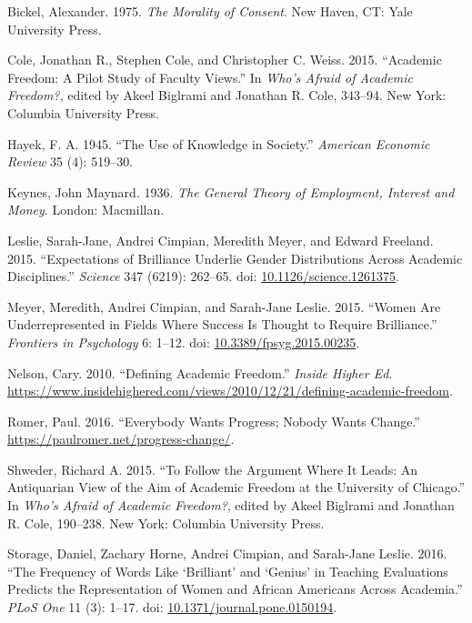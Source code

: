 \documentclass[
  10pt,
  letterpaper,
  DIV=11,
  numbers=noendperiod,
  twoside]{scrartcl}
\newlength{\cslhangindent}
\newenvironment{CSLReferences}[2] %
 {\begin{list}{}{%
  \setlength{\itemindent}{0pt}
  \setlength{\leftmargin}{0pt}
  \setlength{\parsep}{0pt}
  \ifodd #1
   \setlength{\leftmargin}{\cslhangindent}
   \setlength{\itemindent}{-1\cslhangindent}
  \fi
  \setlength{\itemsep}{#2\baselineskip}}}
 {\end{list}}
\begin{document}
\label{refs}
\begin{CSLReferences}{1}{0}
Bickel, Alexander. 1975. \emph{The Morality of Consent}. New Haven, CT:
Yale University Press.

Cole, Jonathan R., Stephen Cole, and Christopher C. Weiss. 2015.
{``Academic Freedom: A Pilot Study of Faculty Views.''} In \emph{Who's
Afraid of Academic Freedom?}, edited by Akeel Biglrami and Jonathan R.
Cole, 343--94. New York: Columbia University Press.

Hayek, F. A. 1945. {``The Use of Knowledge in Society.''} \emph{American
Economic Review} 35 (4): 519--30.

Keynes, John Maynard. 1936. \emph{The General Theory of Employment,
Interest and Money}. London: Macmillan.

Leslie, Sarah-Jane, Andrei Cimpian, Meredith Meyer, and Edward Freeland.
2015. {``Expectations of Brilliance Underlie Gender Distributions Across
Academic Disciplines.''} \emph{Science} 347 (6219): 262--65. doi:
\href{https://doi.org/10.1126/science.1261375}{10.1126/science.1261375}.

Meyer, Meredith, Andrei Cimpian, and Sarah-Jane Leslie. 2015. {``Women
Are Underrepresented in Fields Where Success Is Thought to Require
Brilliance.''} \emph{Frontiers in Psychology} 6: 1--12. doi:
\href{https://doi.org/10.3389/fpsyg.2015.00235}{10.3389/fpsyg.2015.00235}.

Nelson, Cary. 2010. {``Defining Academic Freedom.''} \emph{Inside Higher
Ed}.
\url{https://www.insidehighered.com/views/2010/12/21/defining-academic-freedom}.

Romer, Paul. 2016. {``Everybody Wants Progress; Nobody Wants Change.''}
\url{https://paulromer.net/progress-change/}.

Shweder, Richard A. 2015. {``To Follow the Argument Where It Leads: An
Antiquarian View of the Aim of Academic Freedom at the University of
Chicago.''} In \emph{Who's Afraid of Academic Freedom?}, edited by Akeel
Biglrami and Jonathan R. Cole, 190--238. New York: Columbia University
Press.

Storage, Daniel, Zachary Horne, Andrei Cimpian, and Sarah-Jane Leslie.
2016. {``The Frequency of Words Like {`Brilliant'} and {`Genius'} in
Teaching Evaluations Predicts the Representation of Women and African
Americans Across Academia.''} \emph{PLoS One} 11 (3): 1--17. doi:
\href{https://doi.org/10.1371/journal.pone.0150194}{10.1371/journal.pone.0150194}.


\end{CSLReferences}
\end{document}
